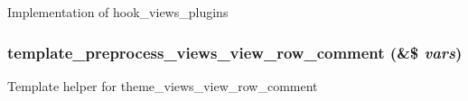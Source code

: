 Implementation of hook\_\-views\_\-plugins \hypertarget{group__views__comment__module_gc5f17442ee6b1364544217dc2515f0ef}{
\subsubsection[{template\_\-preprocess\_\-views\_\-view\_\-row\_\-comment}]{\setlength{\rightskip}{0pt plus 5cm}template\_\-preprocess\_\-views\_\-view\_\-row\_\-comment (\&\$ {\em vars})}}
\label{group__views__comment__module_gc5f17442ee6b1364544217dc2515f0ef}


Template helper for theme\_\-views\_\-view\_\-row\_\-comment 